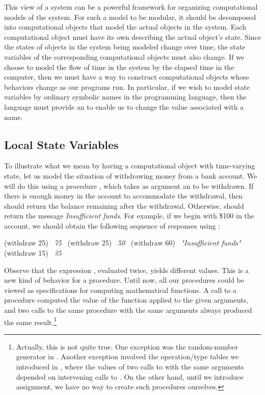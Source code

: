 This view of a system can be a powerful framework for organizing computational
models of the system.  For such a model to be modular, it should be decomposed
into computational objects that model the actual objects in the system.  Each
computational object must have its own 
describing the actual object's state.  Since the states of objects in the
system being modeled change over time, the state variables of the corresponding
computational objects must also change.  If we choose to model the flow of time
in the system by the elapsed time in the computer, then we must have a way to
construct computational objects whose behaviors change as our programs run.  In
particular, if we wish to model state variables by ordinary symbolic names in
the programming language, then the language must provide an  to enable us to change the value associated with a name.



\subsection{Local State Variables}
\label{Section 3.1.1}

To illustrate what we mean by having a computational object with time-varying
state, let us model the situation of withdrawing money from a bank account.  We
will do this using a procedure , which takes as argument an
 to be withdrawn.  If there is enough money in the account to
accommodate the withdrawal, then  should return the balance
remaining after the withdrawal.  Otherwise,  should return the
message \emph{Insufficient funds}. For example, if we begin with \$100 in the
account, we should obtain the following sequence of responses using
:

\begin{codeBlock}
(withdraw 25)
~\textit{75}~
(withdraw 25)
~\textit{50}~
(withdraw 60)
~\textit{"Insufficient funds"}~
(withdraw 15)
~\textit{35}~
\end{codeBlock}

\noindent
Observe that the expression , evaluated twice, yields
different values.  This is a new kind of behavior for a procedure.  Until now,
all our procedures could be viewed as specifications for computing mathematical
functions.  A call to a procedure computed the value of the function applied to
the given arguments, and two calls to the same procedure with the same
arguments always produced the same result.\footnote{Actually, this is not quite
true.  One exception was the random-number generator in .
Another exception involved the operation/type tables we introduced in
, where the values of two calls to  with the same
arguments depended on intervening calls to .  On the other hand,
until we introduce assignment, we have no way to create such procedures
ourselves.}

